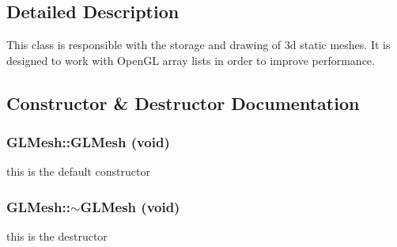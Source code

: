 \subsection{Detailed Description}
This class is responsible with the storage and drawing of 3d static meshes. It is designed to work with OpenGL array lists in order to improve performance. 

\subsection{Constructor \& Destructor Documentation}
\hypertarget{classCartWheel_1_1GL_1_1GLMesh_a49c79d4aea35e7e8b28e14231ba2af50}{
\subsubsection[{GLMesh}]{\setlength{\rightskip}{0pt plus 5cm}GLMesh::GLMesh (void)}}
\label{classCartWheel_1_1GL_1_1GLMesh_a49c79d4aea35e7e8b28e14231ba2af50}
this is the default constructor \hypertarget{classCartWheel_1_1GL_1_1GLMesh_a4a3c2a89f644114697c6bcaaa67e0f9f}{
\subsubsection[{$\sim$GLMesh}]{\setlength{\rightskip}{0pt plus 5cm}GLMesh::$\sim$GLMesh (void)}}
\label{classCartWheel_1_1GL_1_1GLMesh_a4a3c2a89f644114697c6bcaaa67e0f9f}
this is the destructor 

